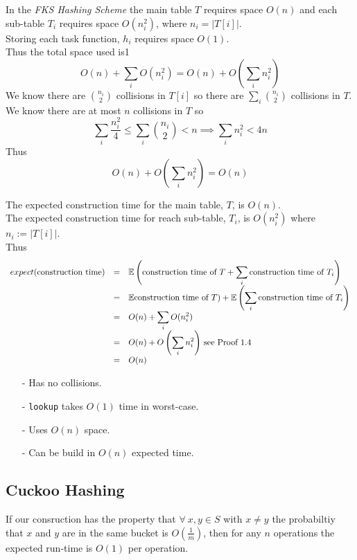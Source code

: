\documentclass[11pt,a4paper]{article}
\begin{document}
In the \textit{FKS Hashing Scheme} the main table $T$ requires space $O(n)$ and each sub-table $T_i$ requires space $O(n_i^2)$, where $n_i=|T[i]|$.\\
Storing each task function, $h_i$ requires space $O(1)$.\\
Thus the total space used is1
$$O(n)+\sum_iO(n_i^2)=O(n)+O\left(\sum_in_i^2\right)$$
We know there are ${n_i\choose 2}$ collisions in $T[i]$ so there are $\sum_i{n_i\choose 2}$ collisions in $T$.\\
We know there are at most $n$ collisions in $T$ so
$$\sum_i\frac{n_i^2}{4}\leq\sum_i{n_i\choose2}<n\implies\sum_in_i^2<4n$$
Thus
$$O(n)+O\left(\sum_in_i^2\right)=O(n)$$

The expected construction time for the main table, $T$, is $O(n)$.\\
The expected construction time for reach sub-table, $T_i$, is $O(n_i^2)$ where $n_i:=|T[i]|$.\\
Thus
\[\begin{array}{rcl}
expect(\text{construction time})&=&{\displaystyle\mathbb{E}\left(\text{construction time of }T+\sum_i\text{construction time of }T_i\right)}\\
&=&\mathbb{E}\text{construction time of }T)+{\displaystyle\mathbb{E}\left(\sum_i\text{construction time of }T_i\right)}\\
&=&O(n)+{\displaystyle\sum_iO(n_i^2)}\\
&=&O(n)+{\displaystyle O\left(\sum_in_i^2\right)}\text{ see Proof 1.4}\\
&=&O(n)
\end{array}\]

\begin{itemize}
	\item[-] Has no collisions.
	\item[-] \lstinline!lookup! takes $O(1)$ time in worst-case.
	\item[-] Uses $O(n)$ space.
	\item[-] Can be build in $O(n)$ expected time.
\end{itemize}

\subsection{Cuckoo Hashing}

\remark{}
If our consruction has the property that $\forall\ x,y\in S$ with $x\neq y$ the probabiltiy that $x$ and $y$ are in the same bucket is $O\left(\frac1m\right)$, then for any $n$ operations the expected run-time is $O(1)$ per operation.\\
\end{document}

